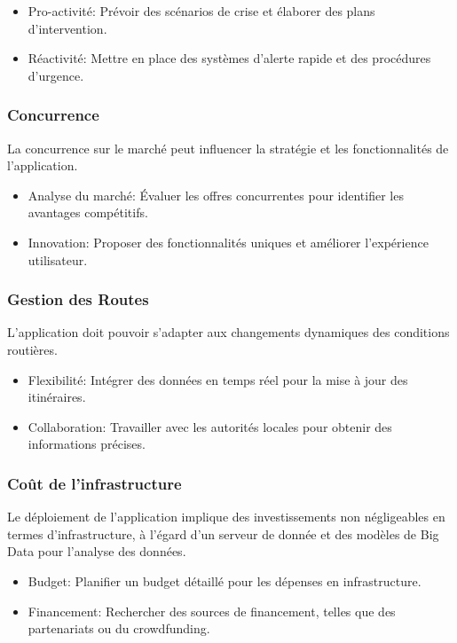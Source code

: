 \begin{itemize}
    \item Pro-activité: Prévoir des scénarios de crise et élaborer des plans d'intervention.
    \item Réactivité: Mettre en place des systèmes d'alerte rapide et des procédures d'urgence.
\end{itemize}

\subsubsection*{Concurrence}
La concurrence sur le marché peut influencer la stratégie et les fonctionnalités de l'application.
\begin{itemize}
    \item Analyse du marché: Évaluer les offres concurrentes pour identifier les avantages compétitifs.
    \item Innovation: Proposer des fonctionnalités uniques et améliorer l'expérience utilisateur.
\end{itemize}

\subsubsection*{Gestion des Routes}
L'application doit pouvoir s'adapter aux changements dynamiques des conditions routières.
\begin{itemize}
    \item Flexibilité: Intégrer des données en temps réel pour la mise à jour des itinéraires.
    \item Collaboration: Travailler avec les autorités locales pour obtenir des informations précises.
\end{itemize}

\subsubsection*{Coût de l'infrastructure}
Le déploiement de l'application implique des investissements non négligeables en termes d'infrastructure, à l'égard d'un serveur de donnée et des modèles de Big Data pour l'analyse des données.
\begin{itemize}
    \item Budget: Planifier un budget détaillé pour les dépenses en infrastructure.
    \item Financement: Rechercher des sources de financement, telles que des partenariats ou du crowdfunding.
\end{itemize}

